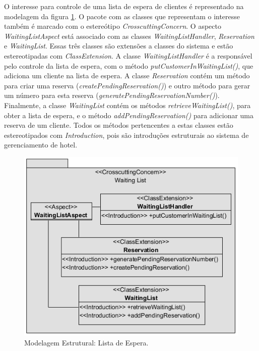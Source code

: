 O interesse para controle de uma lista de espera de clientes é representado na modelagem da figura \ref{fig:case_study_structural_waiting_list}. O
pacote com as classes que representam o interesse também é marcado com o estereótipo \textit{CrosscuttingConcern}. O aspecto \textit{WaitingListAspect} está
associado com as classes \textit{WaitingListHandler}, \textit{Reservation} e \textit{WaitingList}. Essas três classes são extensões a classes do
sistema e estão estereotipadas com \textit{ClassExtension}. A classe \textit{WaitingListHandler} é a responsável pelo controle da lista de espera, com
o método \textit{putCustomerInWaitingList()}, que adiciona um cliente na lista de espera. A classe \textit{Reservation} contém um método para criar
uma reserva (\textit{createPendingReservation()}) e outro método para gerar um número para esta reserva (\textit{generatePendingReservationNumber()}).
Finalmente, a classe \textit{WaitingList} contém os métodos \textit{retrieveWaitingList()}, para obter a lista de espera, e o método
\textit{addPendingReservation()} para adicionar uma reserva de um cliente. Todos os métodos pertencentes a estas classes estão estereotipados com
\textit{Introduction}, pois são introduções estruturais ao sistema de gerenciamento de hotel.

  \begin{figure}
	\centering
	\includegraphics{img/case_study_structural_waiting_list.png}
	\caption{Modelagem Estrutural: Lista de Espera.}\label{fig:case_study_structural_waiting_list}
  \end{figure}
  
